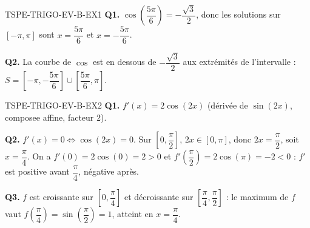 \begin{corrige}{TSPE-TRIGO-EV-B-EX1}
\textbf{Q1.} $\cos\!\left(\dfrac{5\pi}{6}\right) = -\dfrac{\sqrt{3}}{2}$, donc les solutions sur $[-\pi,\pi]$ sont $x=\dfrac{5\pi}{6}$ et $x=-\dfrac{5\pi}{6}$.

\textbf{Q2.} La courbe de $\cos$ est en dessous de $-\dfrac{\sqrt{3}}{2}$ aux extrémités de l'intervalle : $S = \left[-\pi, -\dfrac{5\pi}{6}\right] \cup \left[\dfrac{5\pi}{6}, \pi\right]$.
\end{corrige}

\begin{corrige}{TSPE-TRIGO-EV-B-EX2}
\textbf{Q1.} $f'(x) = 2\cos(2x)$ (dérivée de $\sin(2x)$, composee affine, facteur $2$).

\textbf{Q2.} $f'(x) = 0 \iff \cos(2x) = 0$. Sur $\left[0,\dfrac{\pi}{2}\right]$, $2x \in [0,\pi]$, donc $2x=\dfrac{\pi}{2}$, soit $x=\dfrac{\pi}{4}$. On a $f'(0)=2\cos(0)=2>0$ et $f'\!\left(\dfrac{\pi}{2}\right)=2\cos(\pi)=-2<0$ : $f'$ est positive avant $\dfrac{\pi}{4}$, négative après.

\textbf{Q3.} $f$ est croissante sur $\left[0,\dfrac{\pi}{4}\right]$ et décroissante sur $\left[\dfrac{\pi}{4},\dfrac{\pi}{2}\right]$ : le maximum de $f$ vaut $f\!\left(\dfrac{\pi}{4}\right) = \sin\!\left(\dfrac{\pi}{2}\right) = 1$, atteint en $x=\dfrac{\pi}{4}$.
\end{corrige}
